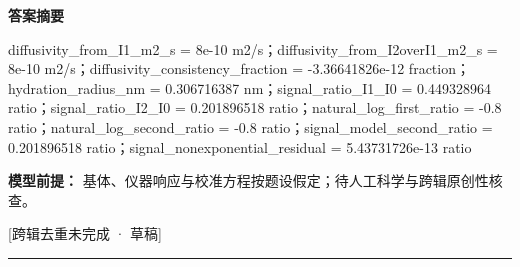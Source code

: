 \documentclass[UTF8,11pt,a4paper]{ctexart}
\begin{document}
\noindent\textbf{答案摘要}\par
diffusivity\_from\_I1\_m2\_s = 8e-10 m2/s；diffusivity\_from\_I2overI1\_m2\_s = 8e-10 m2/s；diffusivity\_consistency\_fraction = -3.36641826e-12 fraction；hydration\_radius\_nm = 0.306716387 nm；signal\_ratio\_I1\_I0 = 0.449328964 ratio；signal\_ratio\_I2\_I0 = 0.201896518 ratio；natural\_log\_first\_ratio = -0.8 ratio；natural\_log\_second\_ratio = -0.8 ratio；signal\_model\_second\_ratio = 0.201896518 ratio；signal\_nonexponential\_residual = 5.43731726e-13 ratio\par
\noindent\textbf{模型前提：}
基体、仪器响应与校准方程按题设假定；待人工科学与跨辑原创性核查。\par
\noindent\textcolor{red!65!black}{[跨辑去重未完成 · 草稿]} \par
\medskip\hrule\medskip
{}
\end{document}
